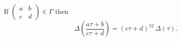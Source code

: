If $\begin{pmatrix} a & b \\ c & d \end{pmatrix} \in \Gamma$ then
$$\Delta\!\left(\frac{a\tau + b}{c\tau + d}\right) = (c\tau + d)^{12}\,\Delta(\tau).$$
